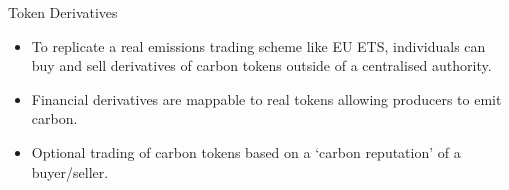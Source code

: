 \begin{frame}{Token Derivatives}
    \begin{itemize}
        \item To replicate a real emissions trading scheme like EU ETS,
              individuals can buy and sell derivatives of carbon tokens outside of
              a centralised authority.
        \item Financial derivatives are mappable to real tokens allowing
              producers to emit carbon.
        \item Optional trading of carbon tokens based on a `carbon reputation'
              of a buyer/seller.
    \end{itemize}
\end{frame}
